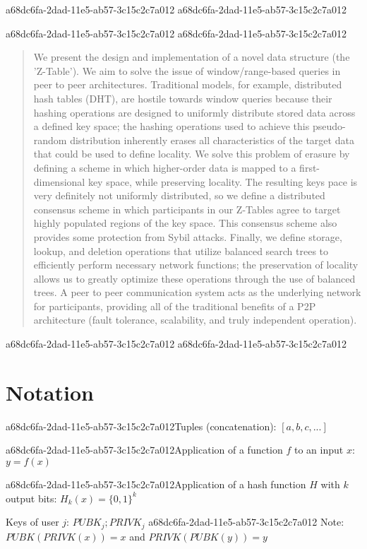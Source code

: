 \documentclass[12pt]{article}
\begin{document}
a68dc6fa-2dad-11e5-ab57-3c15c2c7a012
a68dc6fa-2dad-11e5-ab57-3c15c2c7a012\maketitle
a68dc6fa-2dad-11e5-ab57-3c15c2c7a012
a68dc6fa-2dad-11e5-ab57-3c15c2c7a012\begin{abstract}
We present the design and implementation of a novel data structure (the 'Z-Table'). We aim to solve the issue of window/range-based queries in peer to peer architectures. Traditional models, for example,  distributed hash tables (DHT), are hostile towards window queries because their hashing operations are designed to uniformly distribute stored data across a defined key space; the hashing operations used to achieve this pseudo-random distribution inherently erases all characteristics of the target data that could be used to define locality. We solve this problem of erasure by defining a scheme in which higher-order data is mapped to a first-dimensional key space, while preserving locality. The resulting keys pace is very definitely not uniformly distributed, so we define a distributed consensus scheme in which participants in our Z-Tables agree to target highly populated regions of the key space. This consensus scheme also provides some protection from Sybil attacks. Finally, we define storage, lookup, and deletion operations that utilize balanced search trees to efficiently perform necessary network functions; the preservation of locality allows us to greatly optimize these operations through the use of balanced trees. A peer to peer communication system acts as the underlying network for participants, providing all of the traditional benefits of a P2P architecture (fault tolerance, scalability, and truly independent operation).
\end{abstract}
a68dc6fa-2dad-11e5-ab57-3c15c2c7a012
a68dc6fa-2dad-11e5-ab57-3c15c2c7a012\section{Notation}

a68dc6fa-2dad-11e5-ab57-3c15c2c7a012Tuples (concatenation): $[a,b,c,...]$

a68dc6fa-2dad-11e5-ab57-3c15c2c7a012Application of a function $f$ to an input $x$: $y=f(x)$

a68dc6fa-2dad-11e5-ab57-3c15c2c7a012Application of a hash function $H$ with $k$ output bits: $H_{k}(x) = \{0,1\}^k$

Keys of user $j$: $ PUBK_j; PRIVK_j $
a68dc6fa-2dad-11e5-ab57-3c15c2c7a012
Note: $PUBK(PRIVK(x)) = x$ and $PRIVK(PUBK(y)) = y$~
\end{document}
